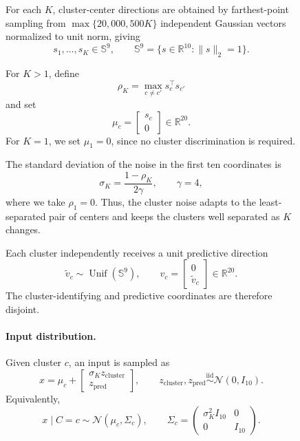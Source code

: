 \documentclass{article}
\begin{document}
\begin{figure}
For each \(K\), cluster-center directions are obtained by farthest-point
sampling from \(\max\{20{,}000,500K\}\) independent Gaussian vectors
normalized to unit norm, giving
\[
    s_1,\ldots,s_K\in\mathbb S^9,
    \qquad
    \mathbb S^9
    =
    \{s\in\mathbb R^{10}:\|s\|_2=1\}.
\]

For \(K>1\), define
\[
    \rho_K
    =
    \max_{c\neq c'}s_c^\top s_{c'}
\]
and set
\[
    \mu_c
    =
    \begin{bmatrix}
        s_c\\
        0
    \end{bmatrix}
    \in\mathbb R^{20}.
\]
For \(K=1\), we set \(\mu_1=0\), since no cluster discrimination is required.

The standard deviation of the noise in the first ten coordinates is
\begin{equation}
    \sigma_K
    =
    \frac{1-\rho_K}{2\gamma},
    \qquad
    \gamma=4,
    \label{eq:local-routing-noise}
\end{equation}
where we take \(\rho_1=0\). Thus, the cluster noise adapts to the
least-separated pair of centers and keeps the clusters well separated as
\(K\) changes.

Each cluster independently receives a unit predictive direction
\[
    \widetilde v_c
    \sim
    \operatorname{Unif}(\mathbb S^9),
    \qquad
    v_c
    =
    \begin{bmatrix}
        0\\
        \widetilde v_c
    \end{bmatrix}
    \in\mathbb R^{20}.
\]
The cluster-identifying and predictive coordinates are therefore disjoint.


\paragraph{Input distribution.}
Given cluster \(c\), an input is sampled as
\begin{equation}
    x
    =
    \mu_c+
    \begin{bmatrix}
        \sigma_K z_{\mathrm{cluster}}\\
        z_{\mathrm{pred}}
    \end{bmatrix},
    \qquad
    z_{\mathrm{cluster}},z_{\mathrm{pred}}
    \stackrel{\mathrm{iid}}{\sim}
    \mathcal N(0,I_{10}).
    \label{eq:local-routing-data}
\end{equation}
Equivalently,
\[
    x\mid C=c
    \sim
    \mathcal N(\mu_c,\Sigma_c),
    \qquad
    \Sigma_c
    =
    \begin{pmatrix}
        \sigma_K^2 I_{10} & 0\\
        0 & I_{10}
    \end{pmatrix}.
\]



\end{figure}
\end{document}
